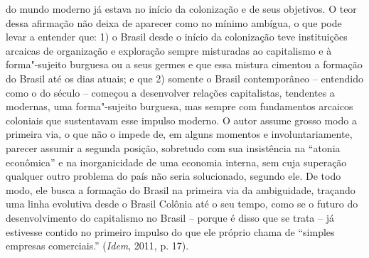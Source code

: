 do mundo moderno já estava no início da colonização e de seus objetivos.
O teor dessa afirmação não deixa de aparecer como no mínimo ambígua, o
que pode levar a entender que: 1) o Brasil desde o início da colonização
teve instituições arcaicas de organização e exploração sempre misturadas
ao capitalismo e à forma"-sujeito burguesa ou a seus germes e que essa
mistura cimentou a formação do Brasil até os dias atuais; e que 2)
somente o Brasil contemporâneo -- entendido como o do século  --
começou a desenvolver relações capitalistas, tendentes a modernas, uma
forma"-sujeito burguesa, mas sempre com fundamentos arcaicos coloniais
que sustentavam esse impulso moderno. O autor assume grosso modo a
primeira via, o que não o impede de, em alguns momentos e
involuntariamente, parecer assumir a segunda posição, sobretudo com sua
insistência na ``atonia econômica'' e na inorganicidade de uma economia
interna, sem cuja superação qualquer outro problema do país não seria
solucionado, segundo ele. De todo modo, ele busca a formação do Brasil
na primeira via da ambiguidade, traçando uma linha evolutiva desde o
Brasil Colônia até o seu tempo, como se o futuro do desenvolvimento do
capitalismo no Brasil -- porque é disso que se trata -- já estivesse
contido no primeiro impulso do que ele próprio chama de ``simples
empresas comerciais.'' (\emph{Idem}, 2011, p. 17).


